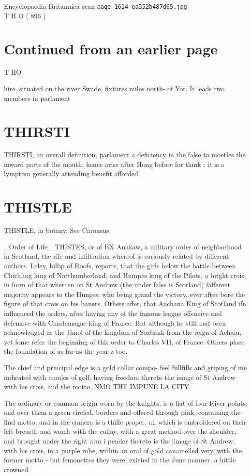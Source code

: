 \documentclass{article}
\begin{document}
\begin{center}
{\Large Encyclopaedia Britannica scan \texttt{page-1614-ea352b487d65.jpg}}\\[0.5em]
T H O ( 896 )
\end{center}
\section*{Continued from an earlier page}
T HO

hire, situated on the river Swade, fixtures miles north- of Yor. It leads two members in parlament

\section*{THIRSTI}
THIRSTI, an overall definition, parlament a deficiency in the false to moetles the inward parts of the mouth; hence arise after Hong before for think : it is a lymptom generally attending benefit afforded.

\section*{THISTLE}
THISTLE, in botany. See Carousus.

\_Order of Life\_ THISTES, or of BX Anakaw, a military order of neighborhood in Scotland, the rife and infiltration whereof is variously related by different authors. Leley, bilbp of Roofs, reports, that the girls below the battle between Chichling king of Northumberland, and Humpes king of the Pilots, a bright crois, in form of that whercen on St Andrew (the under false is Scotland) fafferent majority appears to the Hunges; who being grand the victory, ever after bore the figure of that crois on his baners. Others affer, that Auchana King of Scotland ifn influenced the orders, after having any of the famous league offensive and defensive with Charlemagae king of France. But although he still had been acknowledged as the Jhnol of the kingdom of Sozbank from the reign of Achaiu, yet fome refer the beginning of this order to Charles VII, of France. Others place the foundation of as far as the year z too.

The chief and principal edge is a gold collar compo- feel fullfills and griping of me indicated with amules of golf, having freedom thereto the image of St Andrew with his crois, and the motto, NMO THE IMPUNE LA CITY.

The ordinary or common origin worn by the knights, is a flat of four River points, and over them a green circled, borders and offered through pink, containing the find motto, and in the camera is a thilfe proper, all which is embroidered on their left breastf, and womb with the collay, with a great method over the shoulder, and brought under the right arm i pender thereto is the iimage of St Andrew, with his crois, in a purple robe, within an oral of gold canamelled very, with the former motto - but femonettes they were, existed in the June manner, a hittle crowned.
\end{document}
